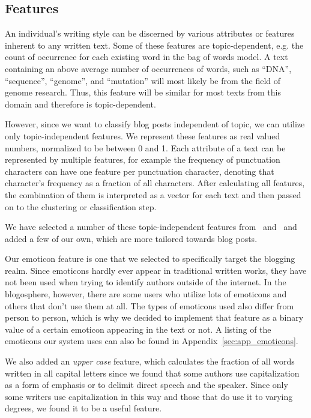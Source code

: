 \subsection{Features}
\label{sec:features}

An individual's writing style can be discerned by various attributes or features inherent to any written text.
Some of these features are topic-dependent, e.g. the count of occurrence for each existing word in the bag of words model.
A text containing an above average number of occurrences of words, such as ``DNA'', ``sequence'', ``genome'', and ``mutation'' will most likely be from the field of genome research.
Thus, this feature will be similar for most texts from this domain and therefore is topic-dependent.


However, since we want to classify blog posts independent of topic, we can utilize only topic-independent features.
We represent these features as real valued numbers, normalized to be between 0  and 1.
Each attribute of a text can be represented by multiple features, for example the frequency of punctuation characters can have one feature per punctuation character, denoting that character's frequency as a fraction of all characters.
After calculating all features, the combination of them is interpreted as a vector for each text and then passed on to the clustering or classification step.


We have selected a number of these topic-independent features from~\cite{madigan2005author} and~\cite{narayanan2012feasibility} and added a few of our own, which are more tailored towards blog posts.


Our emoticon feature is one that we selected to specifically target the blogging realm.
Since emoticons hardly ever appear in traditional written works, they have not been used when trying to identify authors outside of the internet.
In the blogosphere, however, there are some users who utilize lots of emoticons and others that don't use them at all.
The types of emoticons used also differ from person to person, which is why we decided to implement that feature as a binary value of a certain emoticon appearing in the text or not.
A listing of the emoticons our system uses can also be found in Appendix~\ref{sec:app_emoticons}.


We also added an \textit{upper case} feature, which calculates the fraction of all words written in all capital letters since we found that some authors use capitalization as a form of emphasis or to delimit direct speech and the speaker.
Since only some writers use capitalization in this way and those that do use it to varying degrees, we found it to be a useful feature.



